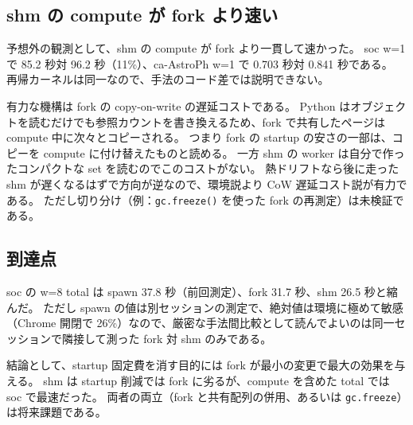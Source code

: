 \subsection{shm の compute が fork より速い}

予想外の観測として、shm の compute が fork より一貫して速かった。
soc w=1 で 85.2 秒対 96.2 秒（11\%）、ca-AstroPh w=1 で 0.703 秒対 0.841 秒である。
再帰カーネルは同一なので、手法のコード差では説明できない。

有力な機構は fork の copy-on-write の遅延コストである。
Python はオブジェクトを読むだけでも参照カウントを書き換えるため、fork で共有したページは compute 中に次々とコピーされる。
つまり fork の startup の安さの一部は、コピーを compute に付け替えたものと読める。
一方 shm の worker は自分で作ったコンパクトな set を読むのでこのコストがない。
熱ドリフトなら後に走った shm が遅くなるはずで方向が逆なので、環境説より CoW 遅延コスト説が有力である。
ただし切り分け（例：\texttt{gc.freeze()} を使った fork の再測定）は未検証である。

\subsection{到達点}

soc の w=8 total は spawn 37.8 秒（前回測定）、fork 31.7 秒、shm 26.5 秒と縮んだ。
ただし spawn の値は別セッションの測定で、絶対値は環境に極めて敏感（Chrome 開閉で 26\%）なので、厳密な手法間比較として読んでよいのは同一セッションで隣接して測った fork 対 shm のみである。

結論として、startup 固定費を消す目的には fork が最小の変更で最大の効果を与える。
shm は startup 削減では fork に劣るが、compute を含めた total では soc で最速だった。
両者の両立（fork と共有配列の併用、あるいは \texttt{gc.freeze}）は将来課題である。
